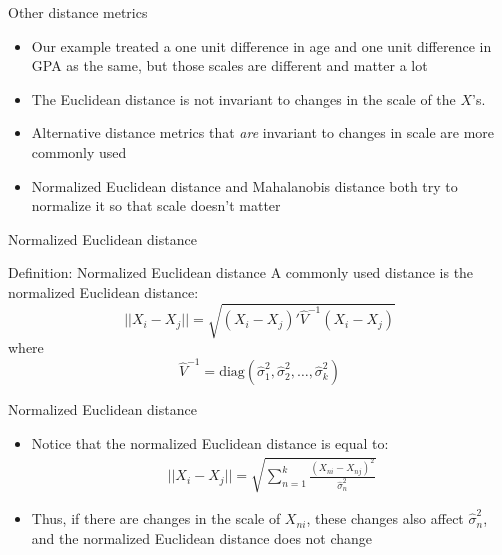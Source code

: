 \documentclass{beamer}
\begin{document}
 




\begin{frame}{Other distance metrics}

\begin{itemize}
\item Our example treated a one unit difference in age and one unit difference in GPA as the same, but those scales are different and matter a lot
\item The Euclidean distance is not invariant to changes in the scale of the $X$'s.  
\item Alternative distance metrics that \emph{are} invariant to changes in scale are more commonly used 
\item Normalized Euclidean distance and Mahalanobis distance both try to normalize it so that scale doesn't matter
\end{itemize}

\end{frame}


\begin{frame}{Normalized Euclidean distance}

	\begin{block}{Definition: Normalized Euclidean distance}
	  A commonly used distance is the normalized Euclidean distance:$$||X_i-X_j|| = \sqrt{ (X_i-X_j)'\widehat{V}^{-1}(X_i - X_j) }$$ where
		$$\widehat{V}^{-1} = \text{diag}(\widehat{\sigma}_1^2, \widehat{\sigma}_2^2, \dots, \widehat{\sigma}_k^2)$$
	\end{block}
\end{frame}

\begin{frame}{Normalized Euclidean distance}
	\begin{itemize}
	\item Notice that the normalized Euclidean distance is equal to:
		\begin{eqnarray*}
		||X_i - X_j|| = \sqrt{\sum_{n=1}^k \frac{(X_{ni} - X_{nj})^2}{\widehat{\sigma}^2_n}}
		\end{eqnarray*}
	\item Thus, if there are changes in the scale of $X_{ni}$, these changes also affect $\widehat{\sigma}^2_n$, and the normalized Euclidean distance does not change
	\end{itemize}

\end{frame}
\end{document}
